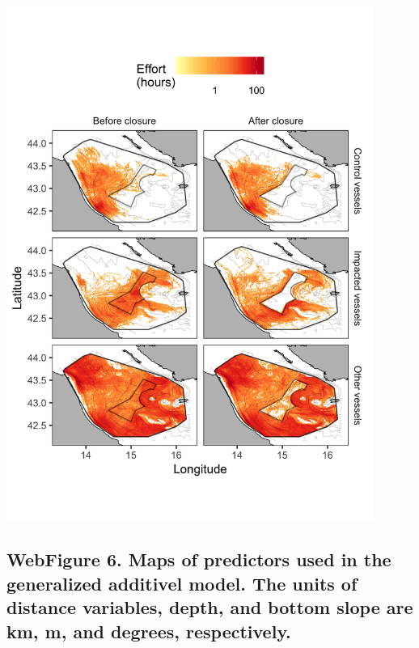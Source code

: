 \documentclass[11pt,]{article}
\begin{document}
\includegraphics[width=0.90000\textwidth]{../ms_1/ms_1_figs/map_baci_hrs_vesci.png}

\newpage

\subsection{WebFigure 6. Maps of predictors used in the generalized
additivel model. The units of distance variables, depth, and bottom
slope are km, m, and degrees,
respectively.}\label{webfigure-6.-maps-of-predictors-used-in-the-generalized-additivel-model.-the-units-of-distance-variables-depth-and-bottom-slope-are-km-m-and-degrees-respectively.}
\end{document}
